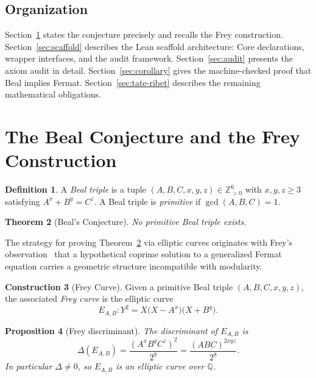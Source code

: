 \documentclass[12pt,reqno]{amsart}
\theoremstyle{plain}
\newtheorem{theorem}{Theorem}[section]
\newtheorem{proposition}[theorem]{Proposition}
\theoremstyle{definition}
\newtheorem{definition}[theorem]{Definition}
\newtheorem{construction}[theorem]{Construction}
\theoremstyle{remark}
\newcommand{\ZZ}{\mathbb{Z}}
\newcommand{\QQ}{\mathbb{Q}}
\begin{document}
\subsection*{Organization}

Section~\ref{sec:beal} states the conjecture precisely and recalls
the Frey construction. Section~\ref{sec:scaffold} describes the Lean
scaffold architecture: Core declarations, wrapper interfaces, and the
audit framework. Section~\ref{sec:audit} presents the axiom audit in detail.
Section~\ref{sec:corollary} gives the machine-checked proof that Beal
implies Fermat. Section~\ref{sec:tate-ribet} describes the remaining
mathematical obligations.

\section{The Beal Conjecture and the Frey Construction}
\label{sec:beal}

\begin{definition}
A \emph{Beal triple} is a tuple $(A,B,C,x,y,z)\in\ZZ_{>0}^6$ with
$x,y,z\geq 3$ satisfying $A^x+B^y=C^z$.
A Beal triple is \emph{primitive} if $\gcd(A,B,C)=1$.
\end{definition}

\begin{theorem}[Beal's Conjecture]
\label{thm:beal}
No primitive Beal triple exists.
\end{theorem}

The strategy for proving Theorem~\ref{thm:beal} via elliptic curves
originates with Frey's observation~\cite{Frey1986} that a hypothetical
coprime solution to a generalized Fermat equation carries a geometric
structure incompatible with modularity.

\begin{construction}[Frey Curve]
\label{const:frey}
Given a primitive Beal triple $(A,B,C,x,y,z)$, the associated
\emph{Frey curve} is the elliptic curve
\[
  E_{A,B}\colon Y^2 = X\bigl(X - A^x\bigr)\bigl(X + B^y\bigr).
\]
\end{construction}

\begin{proposition}[Frey discriminant]
\label{prop:discriminant}
The discriminant of $E_{A,B}$ is
\[
  \Delta(E_{A,B}) = \frac{(A^x B^y C^z)^2}{2^8} = \frac{(ABC)^{2xyz}}{2^8}.
\]
In particular $\Delta\neq 0$, so $E_{A,B}$ is an elliptic curve over $\QQ$.
\end{proposition}
\end{document}
